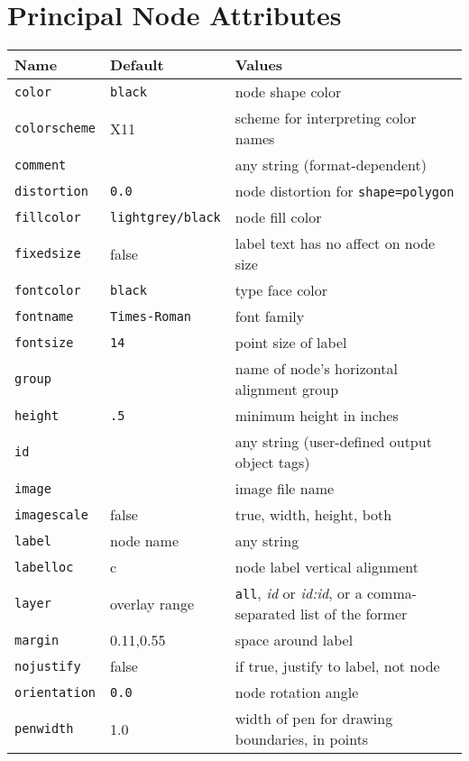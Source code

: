 \documentclass[11pt]{article}
\begin{document}
{\section{Principal Node Attributes}
\label{sec:node_attr}
\begin{tabular}[t]{|l|l|p{3.0in}|} \hline
Name & Default & Values \\ \hline
{\tt color} & {\tt black} & node shape color \\
{\tt colorscheme} & X11 & scheme for interpreting color names \\
{\tt comment} & & any string (format-dependent) \\
{\tt distortion} & {\tt 0.0} & node distortion for {\tt shape=polygon} \\
{\tt fillcolor} & {\tt lightgrey/black} & node fill color \\
{\tt fixedsize} & false & label text has no affect on node size \\
{\tt fontcolor} & {\tt black} & type face color \\
{\tt fontname} & {\tt Times-Roman} & font family \\
{\tt fontsize} & {\tt 14} & point size of label \\
{\tt group} &  & name of node's horizontal alignment group \\
{\tt height} & {\tt .5} & minimum height in inches \\
{\tt id} & & any string (user-defined output object tags) \\
{\tt image} & & image file name \\
{\tt imagescale} & false & true, width, height, both \\
{\tt label} & node name & any string \\
{\tt labelloc} & c & node label vertical alignment \\
{\tt layer} & overlay range & {\tt all}, {\it id} or {\it id:id}, or a comma-separated
list of the former \\
{\tt margin} & 0.11,0.55 & space around label \\
{\tt nojustify} & false & if true, justify to label, not node \\
{\tt orientation} & {\tt 0.0} & node rotation angle \\
{\tt penwidth} & 1.0 & width of pen for drawing boundaries, in points \\

\end{tabular}}
\end{document}
